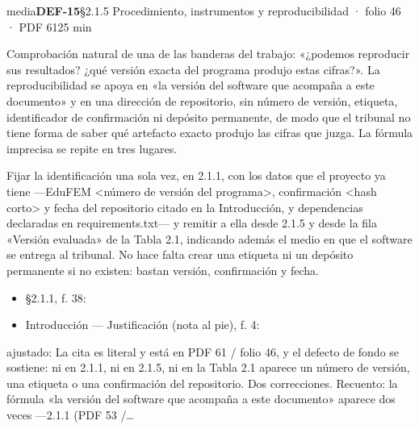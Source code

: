 \begin{ficha}{media}{\casilla\textbf{DEF-15}\quad{}\quad §2.1.5 Procedimiento, instrumentos y reproducibilidad · folio 46 · PDF 61\hfill 25 min}
\par
{}Comprobación natural de una de las banderas del trabajo: «¿podemos reproducir sus resultados? ¿qué versión exacta del programa produjo estas cifras?». La reproducibilidad se apoya en «la versión del software que acompaña a este documento» y en una dirección de repositorio, sin número de versión, etiqueta, identificador de confirmación ni depósito permanente, de modo que el tribunal no tiene forma de saber qué artefacto exacto produjo las cifras que juzga. La fórmula imprecisa se repite en tres lugares.\par
{}Fijar la identificación una sola vez, en 2.1.1, con los datos que el proyecto ya tiene —EduFEM \textless{}número de versión del programa\textgreater{}, confirmación \textless{}hash corto\textgreater{} y fecha del repositorio citado en la Introducción, y dependencias declaradas en requirements.txt— y remitir a ella desde 2.1.5 y desde la fila «Versión evaluada» de la Tabla 2.1, indicando además el medio en que el software se entrega al tribunal. No hace falta crear una etiqueta ni un depósito permanente si no existen: bastan versión, confirmación y fecha.\par
{}\begin{itemize}[leftmargin=1.2em,itemsep=1pt,topsep=1pt]
\item {\small §2.1.1, f. 38: }
\item {\small Introducción — Justificación (nota al pie), f. 4: }
\end{itemize}
{\footnotesize\color{gris}ajustado: La cita es literal y está en PDF 61 /\allowbreak{} folio 46, y el defecto de fondo se sostiene: ni en 2.1.1, ni en 2.1.5, ni en la Tabla 2.1 aparece un número de versión, una etiqueta o una confirmación del repositorio. Dos correcciones. Recuento: la fórmula «la versión del software que acompaña a este documento» aparece dos veces —2.1.1 (PDF 53 /\allowbreak{}…\par}
\end{ficha}
